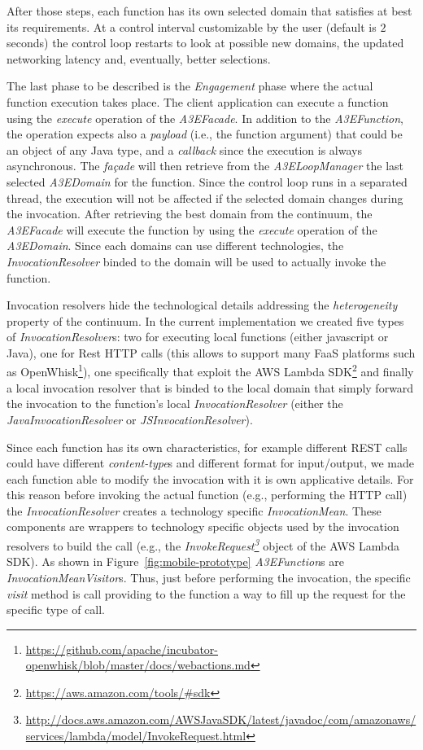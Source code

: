 After those steps, each function has its own selected domain that satisfies at best its requirements. At a control interval customizable by the user (default is $2$ seconds) the control loop restarts to look at possible new domains, the updated networking latency and, eventually, better selections.

The last phase to be described is the \textit{Engagement} phase where the actual function execution takes place. The client application can execute a function using the \textit{execute} operation of the  \textit{A3EFacade}. In addition to the \textit{A3EFunction}, the operation expects also a \textit{payload} (i.e., the function argument) that could be an object of any Java type, and a \textit{callback} since the execution is always asynchronous. The \textit{fa\c{c}ade} will then retrieve from the \textit{A3ELoopManager} the last selected \textit{A3EDomain} for the function. Since the control loop runs in a separated thread, the execution will not be affected if the selected domain changes during the invocation. After retrieving the best domain from the continuum, the \textit{A3EFacade} will execute the function by using the \textit{execute} operation of the \textit{A3EDomain}. Since each domains can use different technologies, the \textit{InvocationResolver} binded to the domain will be used to actually invoke the function. 

Invocation resolvers hide the technological details addressing the \textit{heterogeneity} property of the continuum. In the current implementation we created five types of \textit{InvocationResolver}s: two for executing local functions (either javascript or Java), one for Rest HTTP calls (this allows to support many FaaS platforms such as OpenWhisk\footnote{\url{https://github.com/apache/incubator-openwhisk/blob/master/docs/webactions.md}}), one specifically that exploit the AWS Lambda SDK\footnote{\url{https://aws.amazon.com/tools/\#sdk}} and finally a local invocation resolver that is binded to the local domain that simply forward the invocation to the function's local \textit{InvocationResolver} (either the \textit{JavaInvocationResolver} or \textit{JSInvocationResolver}). 

Since each function has its own characteristics, for example different REST calls could have different \textit{content-type}s and different format for input/output, we made each function able to modify the invocation with it is own applicative details. For this reason before invoking the actual function (e.g., performing the HTTP call) the \textit{InvocationResolver} creates a technology specific \textit{InvocationMean}. These components are wrappers to technology specific objects used by the invocation resolvers to build the call (e.g., the \textit{InvokeRequest\footnote{\url{http://docs.aws.amazon.com/AWSJavaSDK/latest/javadoc/com/amazonaws/services/lambda/model/InvokeRequest.html}}} object of the AWS Lambda SDK). As shown in Figure~\ref{fig:mobile-prototype} \textit{A3EFunction}s are \textit{InvocationMeanVisitor}s. Thus, just before performing the invocation, the specific \textit{visit} method is call providing to the function a way to fill up the request for the specific type of call. 

